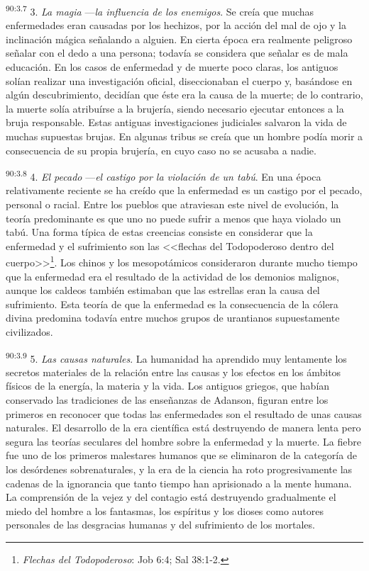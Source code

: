 \documentclass[twoside, 11pt]{book}
\begin{document}
\par
\textsuperscript{90:3.7} 3. \textit{La magia} ---\textit{la influencia de los enemigos}. Se creía que muchas enfermedades eran causadas por los hechizos, por la acción del mal de ojo y la inclinación mágica señalando a alguien. En cierta época era realmente peligroso señalar con el dedo a una persona; todavía se considera que señalar es de mala educación. En los casos de enfermedad y de muerte poco claras, los antiguos solían realizar una investigación oficial, diseccionaban el cuerpo y, basándose en algún descubrimiento, decidían que éste era la causa de la muerte; de lo contrario, la muerte solía atribuírse a la brujería, siendo necesario ejecutar entonces a la bruja responsable. Estas antiguas investigaciones judiciales salvaron la vida de muchas supuestas brujas. En algunas tribus se creía que un hombre podía morir a consecuencia de su propia brujería, en cuyo caso no se acusaba a nadie.

\par
\textsuperscript{90:3.8} 4. \textit{El pecado} ---\textit{el castigo por la violación de un tabú}. En una época relativamente reciente se ha creído que la enfermedad es un castigo por el pecado, personal o racial. Entre los pueblos que atraviesan este nivel de evolución, la teoría predominante es que uno no puede sufrir a menos que haya violado un tabú. Una forma típica de estas creencias consiste en considerar que la enfermedad y el sufrimiento son las <<flechas del Todopoderoso dentro del cuerpo>>\footnote{\textit{Flechas del Todopoderoso}: Job 6:4; Sal 38:1-2.}. Los chinos y los mesopotámicos consideraron durante mucho tiempo que la enfermedad era el resultado de la actividad de los demonios malignos, aunque los caldeos también estimaban que las estrellas eran la causa del sufrimiento. Esta teoría de que la enfermedad es la consecuencia de la cólera divina predomina todavía entre muchos grupos de urantianos supuestamente civilizados.

\par
\textsuperscript{90:3.9} 5. \textit{Las causas naturales}. La humanidad ha aprendido muy lentamente los secretos materiales de la relación entre las causas y los efectos en los ámbitos físicos de la energía, la materia y la vida. Los antiguos griegos, que habían conservado las tradiciones de las enseñanzas de Adanson, figuran entre los primeros en reconocer que todas las enfermedades son el resultado de unas causas naturales. El desarrollo de la era científica está destruyendo de manera lenta pero segura las teorías seculares del hombre sobre la enfermedad y la muerte. La fiebre fue uno de los primeros malestares humanos que se eliminaron de la categoría de los desórdenes sobrenaturales, y la era de la ciencia ha roto progresivamente las cadenas de la ignorancia que tanto tiempo han aprisionado a la mente humana. La comprensión de la vejez y del contagio está destruyendo gradualmente el miedo del hombre a los fantasmas, los espíritus y los dioses como autores personales de las desgracias humanas y del sufrimiento de los mortales.
\end{document}
